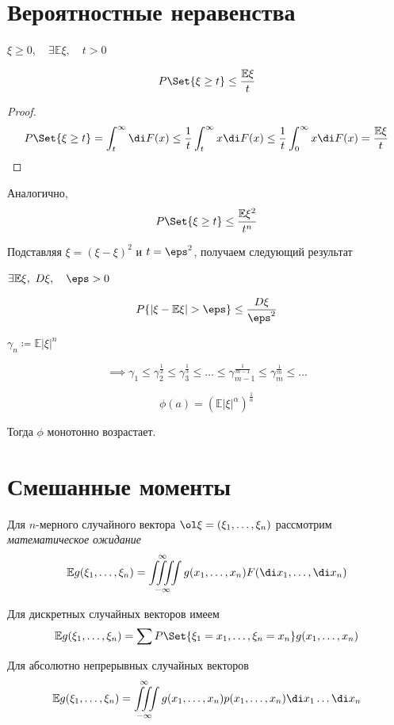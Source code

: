 \section{Вероятностные неравенства}

\begin{lemma}[Чебышёва]
	$ \xi \ge 0, \quad \exists \mathbb E \xi, \quad t > 0 $

	$$ P\Set{\xi \ge t} \le \frac{\mathbb E \xi}t $$
\end{lemma}

\begin{proof}
	$$ P\Set{\xi \ge t} = \int_t^\infty \di F(x) \le \frac1t \int_t^\infty x \di F(x) \le
	\frac1t \int_0^\infty x \di F(x) = \frac{\mathbb E \xi}t $$
\end{proof}

\begin{remark}
	Аналогично,
	$$ P\Set{\xi \ge t} \le \frac{\mathbb E\xi^2}{t^n} $$
\end{remark}

Подставляя $ \xi = (\xi - \mathbb \xi)^2 $ и $ t = \eps^2 $, получаем следующий результат

\begin{statement}
	$ \exists \mathbb E \xi, ~ D \xi, \quad \eps > 0 $

	$$ P\{|\xi - \mathbb E\xi| > \eps\} \le \frac{D\xi}{\eps^2} $$
\end{statement}

\begin{statement}
	$ \gamma_n \coloneq \mathbb E |\xi|^n $

	$$ \implies \gamma_1 \le \gamma_2^{\frac12} \le \gamma_3^{\frac13} \le \dots \le
	\gamma_{m - 1}^{\frac1{m - 1}} \le \gamma_m^{\frac1m} \le \dotso $$

	$$ \phi(a) = (\mathbb E|\xi|^\alpha)^{\frac1\alpha} $$

	Тогда $ \phi $ монотонно возрастает.
\end{statement}

\section{Смешанные моменты}

\begin{definition}
	Для $ n $-мерного случайного вектора $ \ol\xi = (\xi_1, \dots, \xi_n) $ рассмотрим
	\emph{математическое ожидание}
	$$ \mathbb E g(\xi_1, \dots, \xi_n) = \iiiint\limits_{-\infty}^\infty g(x_1, \dots, x_n)
	F(\di x_1, \dots, \di x_n) $$

	Для дискретных случайных векторов имеем
	$$ \mathbb Eg(\xi_1, \dots, \xi_n) = \sum P\Set{\xi_1 = x_1, \dots, \xi_n = x_n}
	g(x_1, \dots, x_n) $$

	Для абсолютно непрерывных случайных векторов
	$$ \mathbb Eg(\xi_1, \dots, \xi_n) = \iiint\limits_{-\infty}^\infty g(x_1, \dots, x_n)
	p(x_1, \dots, x_n) \di x_1 \dots \di x_n $$
\end{definition}


